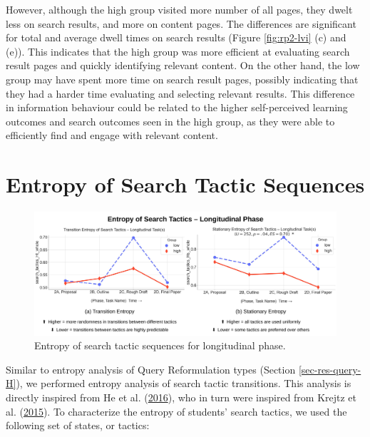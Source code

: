 \documentclass[letterpaper, nobind]{templates/ociamthesis}
\begin{document}
However, although the high group visited more number of all pages, they dwelt less on search results, and more on content pages.
The differences are significant for total and average dwell times on search results (Figure \ref{fig:rp2-lvi} (c) and (e)).
This indicates that the high group was more efficient at evaluating search result pages and quickly identifying relevant content.
On the other hand, the low group may have spent more time on search result pages, possibly indicating that they had a harder time evaluating and selecting relevant results.
This difference in information behaviour could be related to the higher self-perceived learning outcomes and search outcomes seen in the high group, as they were able to efficiently find and engage with relevant content.

\hypertarget{entropy-of-search-tactic-sequences}{%
\section{Entropy of Search Tactic Sequences}\label{entropy-of-search-tactic-sequences}}

\begin{figure}

{\centering \includegraphics[width=1\linewidth]{figs/rp2-tactic-entropy} 

}

\caption[Entropy of search tactic sequences for longitudinal phase.]{Entropy of search tactic sequences for longitudinal phase.}\label{fig:rp2-tactic-entropy}
\end{figure}





Similar to entropy analysis of Query Reformulation types (Section \ref{sec-res-query-H}), we performed entropy analysis of search tactic transitions.
This analysis is directly inspired from He et al. (\protect\hyperlink{ref-he2016beyond}{2016}), who in turn were inspired from Krejtz et al. (\protect\hyperlink{ref-krejtz2015gaze}{2015}).
To characterize the entropy of students' search tactics, we used the following set of states, or tactics:
\end{document}

